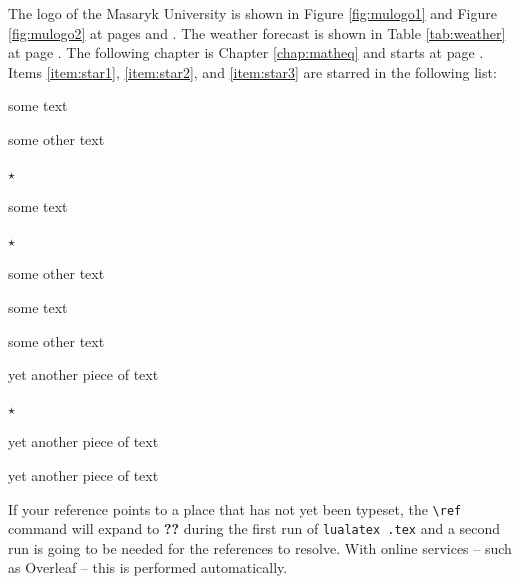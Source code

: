 \documentclass[
  digital,     %
  twoside,     %
  lof,         %
  lot,         %
]{fithesis4}
\begin{document}
The logo of the Masaryk University is shown in Figure \ref{fig:mulogo1} and
Figure \ref{fig:mulogo2} at pages \pageref{fig:mulogo1} and
\pageref{fig:mulogo2}. The weather forecast is shown in Table
\ref{tab:weather} at page \pageref{tab:weather}. The following
chapter is Chapter \ref{chap:matheq} and starts at page
\pageref{chap:matheq}.  Items \ref{item:star1}, \ref{item:star2},
and \ref{item:star3} are starred in the following list:
\begin{compactenum}
  \item some text
  \item some other text
  \item $\star$ \label{item:star1}
  \begin{compactenum}
    \item some text
    \item $\star$ \label{item:star2}
    \item some other text
    \begin{compactenum}
      \item some text
      \item some other text
      \item yet another piece of text
      \item $\star$ \label{item:star3}
    \end{compactenum}
    \item yet another piece of text
  \end{compactenum}
  \item yet another piece of text
\end{compactenum}
If your reference points to a place that has not yet been typeset,
the \verb"\ref" command will expand to \textbf{??} during the first
run of
\texttt{lualatex \jobname.tex}
and a second run is going to be needed for the references to
resolve. With online services -- such as Overleaf -- this is
performed automatically.
\end{document}
